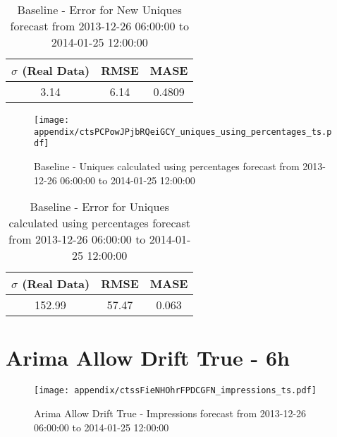 \begin{table}[H]
\centering
\footnotesize
\begin{tabular}{ccc}
$\sigma$ (Real Data) & RMSE & MASE   \\ \hline
3.14 & 6.14 & 0.4809 \\
\end{tabular}

\vspace{0.5cm}

\caption{
Baseline - Error for New Uniques forecast from 2013-12-26 06:00:00 to 2014-01-25 12:00:00}
\end{table}

\begin{figure}[H] \begin{center} \leavevmode
\texttt{[image: appendix/ctsPCPowJPjbRQeiGCY\_uniques\_using\_percentages\_ts.pdf]} \caption{
Baseline - Uniques calculated using percentages forecast from 2013-12-26 06:00:00 to 2014-01-25 12:00:00} \label{fig:appendix/ctsPCPowJPjbRQeiGCY_uniques_using_percentages_ts.pdf} \end{center}
\end{figure}

\begin{table}[H]
\centering
\footnotesize
\begin{tabular}{ccc}
$\sigma$ (Real Data) & RMSE & MASE   \\ \hline
152.99 & 57.47 & 0.063 \\
\end{tabular}

\vspace{0.5cm}

\caption{
Baseline - Error for Uniques calculated using percentages forecast from 2013-12-26 06:00:00 to 2014-01-25 12:00:00}
\end{table}

\section{Arima Allow Drift True - 6h}
\begin{figure}[H] \begin{center} \leavevmode
\texttt{[image: appendix/ctssFieNHOhrFPDCGFN\_impressions\_ts.pdf]} \caption{
Arima Allow Drift True - Impressions forecast from 2013-12-26 06:00:00 to 2014-01-25 12:00:00} \label{fig:appendix/ctssFieNHOhrFPDCGFN_impressions_ts.pdf} \end{center}
\end{figure}

